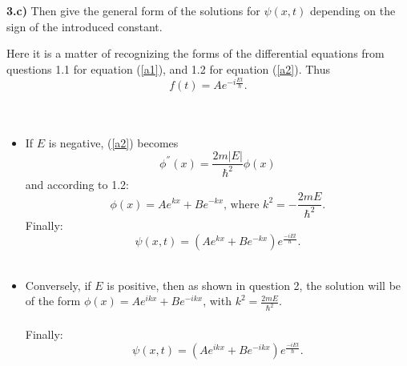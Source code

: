 \medskip

\noindent \textbf{3.c)} Then give the general form of the solutions for $\psi(x,t)$ depending on the sign of the introduced constant.\\

\begin{breakbox}
\noindent Here it is a matter of recognizing the forms of the differential equations from questions 1.1 for equation (\ref{a1}), and 1.2 for equation (\ref{a2}). Thus $$f(t)= Ae^{-i \frac{Et}{\hbar}}.$$\\ \\

\begin{itemize}
    \item If $E$ is negative, (\ref{a2}) becomes $$\phi^{''}(x) = \frac{2m|E|}{\hbar^2}\phi(x)$$ and according to 1.2:
    $$\phi(x) = Ae^{kx} + Be^{-kx}\text{, where } k^2 = -\frac{2mE}{\hbar^2}.$$ Finally:
    $$\boxed{\psi(x,t) = (Ae^{kx} + Be^{-kx})e^{\frac{-iEt}{\hbar}}.}$$
    \\
    \item Conversely, if $E$ is positive, then as shown in question 2, the solution will be of the form $\phi(x) = Ae^{ikx} + Be^{-ikx}$, with $\displaystyle k^2 = \frac{2m
    E}{\hbar^2}.$ \\ \\        Finally: $$\boxed{\psi(x,t) = (Ae^{ikx} + Be^{-ikx})e^{\frac{-iEt}{\hbar}}.}$$
\end{itemize}
\end{breakbox}

